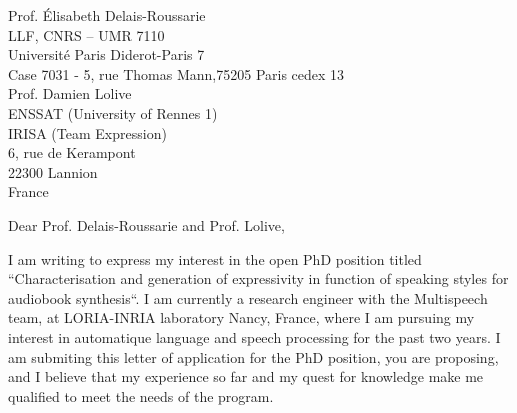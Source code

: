 \documentclass[
	pagenumber=false, %
	parskip=half, %
	fromalign=right, %
	foldmarks=false, %
	addrfield=false %
	]{scrlttr2}
\date{\today} %
\begin{document}
 
\begin{letter}{Prof. Élisabeth Delais\--Roussarie \\ LLF, CNRS – UMR 7110\\ Université Paris Diderot-Paris 7\\
Case 7031 \-- 5, rue Thomas Mann,75205 Paris cedex 13\\ Prof. Damien Lolive\\ ENSSAT (University of Rennes 1)\\ IRISA (Team Expression) \\
6, rue de Kerampont\\
22300 Lannion\\
France\\} %



\opening{Dear Prof. Delais\--Roussarie and Prof. Lolive,}

I am writing to express my interest in the open PhD position titled ``Characterisation  and  generation  of  expressivity  in  function  of  speaking  styles  for  audiobook 
synthesis``. I am currently a research engineer with the Multispeech team, at LORIA-INRIA laboratory Nancy, France, where I am pursuing my interest in automatique language and speech processing for the past two years. I am submiting this letter of application for the PhD position, you are proposing, and I believe that my experience so far and my quest for knowledge make me qualified to meet the needs of the program. 
		

\end{letter}
\end{document}
